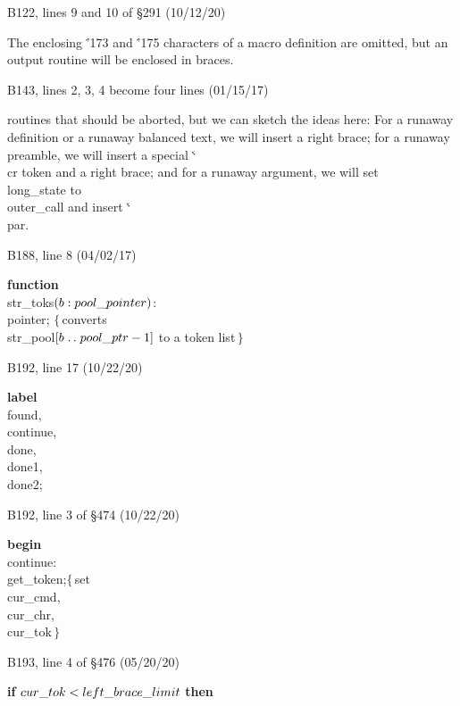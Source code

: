 \goodbreak
\bugonpage B122, lines 9 and 10 of \S291 (10/12/20)

\tenpoint\noindent\quad
The enclosing \.{\char'173} and \.{\char'175} characters of a macro
definition are omitted, but an output routine
will be enclosed in braces.

\bugonpage B143, lines 2, 3, 4 become four lines (01/15/17)

\tenpoint\noindent
routines that should be aborted, but we can sketch the
ideas here:  For a runaway definition or a runaway balanced text,
we will insert a right brace; for a
runaway preamble, we will insert a special \.{\char`\\cr} token and a right
brace; and for a runaway argument, we will set \\{long\_state} to
\\{outer\_call} and insert \.{\char`\\par}.

\bugonpage B188, line 8 (04/02/17)

\ninepoint\noindent
{\bf function} \\{str\_toks}$(b:\\{pool\_pointer})$: \\{pointer};\quad
 $\{\,$converts \\{str\_pool}$[b\mathrel{.\,.}\\{pool\_ptr}-1]$ to a token list$\,\}$

\bugonpage B192, line 17 (10/22/20)

\ninepoint\noindent\quad
{\bf label} \\{found}, \\{continue}, \\{done}, \\{done1}, \\{done2};

\bugonpage B192, line 3 of \S474 (10/22/20)

\ninepoint\noindent\qquad
{\bf begin} \\{continue}: \\{get\_token};\quad$\{\,$set \\{cur\_cmd},
  \\{cur\_chr}, \\{cur\_tok}$\,\}$

\bugonpage B193, line 4 of \S476 (05/20/20)

\ninepoint\noindent\quad
{\bf if} $\\{cur\_tok}<\\{left\_brace\_limit}$ {\bf then}

